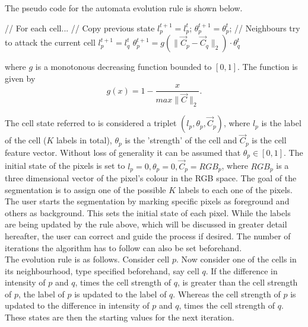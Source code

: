 \documentclass[a4paper,10pt]{article}
\begin{document}
\noindent The pseudo code for the automata evolution rule is shown below. 
\begin{algorithm}[H]
\begin{algorithmic}[1]
 \State // For each cell...
 \State // Copy previous state
 \State $l^{t+1}_{p} = l^{t}_{p}$;
 \State $\theta_{p}^{t+1} = \theta_{p}^{t}$;
 \State // Neighbours try to attack the current cell
 \State $l^{t+1}_{p} = l^{t}_{q}$
 \State $\theta^{t+1}_{p} = g(\| \overrightarrow{C}_{p} - \overrightarrow{C}_{q}
\|_{2}) \cdot \theta^{t}_{q}$
 \EndIf
 \EndFor
 \EndFor
\end{algorithmic}
\end{algorithm}

\noindent where $g$ is a monotonous decreasing function bounded to $[0, 1]$. 
The function is given by
\[
g(x) = 1 - \frac{x}{max\| \overrightarrow{C} \|_{2}}. 
\]

\noindent The cell state referred to is considered a triplet $(l_{p},
\theta_{p}, \overrightarrow{C}_{p})$, where $l_{p}$ is the label of the cell
($K$ labels in total), $\theta_{p}$ is the 'strength' of the cell and
$\overrightarrow{C}_{p}$ is the cell feature vector.  Without loss of generality
it can be assumed that $\theta_{p} \in [0,1]$. 
The initial state of the pixels is set to $l_{p} = 0, \theta_{p} = 0,
\overrightarrow{C}_{p} = RGB_{p}$, where $RGB_{p}$ is a three dimensional vector
of the pixel's colour in 
the RGB space.  The goal of the segmentation is to assign one of the possible
$K$ labels to each one of the pixels.  The user starts the segmentation by
marking specific pixels as
foreground and others as background.  This sets the initial state of each pixel.
 While the labels are being updated by the rule above, which will be discussed
in greater detail hereafter, the user can correct and guide the process if
desired.  The number of iterations the algorithm has to follow can also be set
beforehand.  \\

\noindent The evolution rule is as follows.  Consider cell $p$.  Now consider
one of the cells in its neighbourhood, type specified beforehand, say cell $q$. 
If the difference in intensity of $p$ and $q$, times the cell strength of $q$,
is greater than the cell strength of $p$, the label of $p$ is updated to the
label of $q$.  Whereas the cell strength of $p$ is updated to the difference in
intensity of $p$ and $q$, times the cell strength of $q$.  These states are then
the starting values for the next iteration. \\
\end{document}
